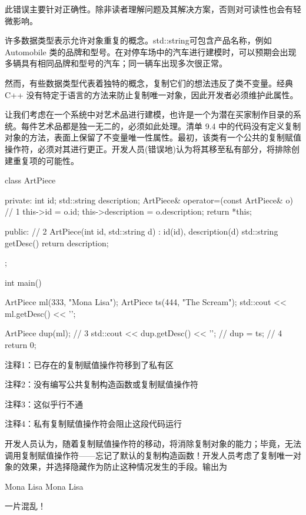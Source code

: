 此错误主要针对正确性。除非读者理解问题及其解决方案，否则对可读性也会有轻微影响。

许多数据类型表示允许对象重复的概念。std::string可包含产品名称，例如 Automobile 类的品牌和型号。在对停车场中的汽车进行建模时，可以预期会出现多辆具有相同品牌和型号的汽车；同一辆车出现多次很正常。

然而，有些数据类型代表着独特的概念，复制它们的想法违反了类不变量。经典 C++ 没有特定于语言的方法来防止复制唯一对象，因此开发者必须维护此属性。


让我们考虑在一个系统中对艺术品进行建模，也许是一个为潜在买家制作目录的系统。每件艺术品都是独一无二的，必须如此处理。清单 9.4 中的代码没有定义复制对象的方法，表面上保留了不变量唯一性属性。最初，该类有一个公共的复制赋值操作符，必须对其进行更正。开发人员(错误地)认为将其移至私有部分，将排除创建重复项的可能性。


\begin{cpp}
class ArtPiece {
private:
  int id;
  std::string description;
  ArtPiece& operator=(const ArtPiece& o) { // 1
    this->id = o.id;
    this->description = o.description;
    return *this;
  }

public: // 2
  ArtPiece(int id, std::string d) : id(id), description(d) {}
  std::string getDesc() { return description; }
};

int main() {
  ArtPiece ml(333, "Mona Lisa");
  ArtPiece ts(444, "The Scream");
  std::cout << ml.getDesc() << '\n';

  ArtPiece dup(ml); // 3
  std::cout << dup.getDesc() << '\n';
  // dup = ts; // 4
  return 0;
}
\end{cpp}

{\footnotesize
注释1：已存在的复制赋值操作符移到了私有区

注释2：没有编写公共复制构造函数或复制赋值操作符

注释3：这似乎行不通

注释4：私有复制赋值操作符会阻止这段代码运行
}

开发人员认为，随着复制赋值操作符的移动，将消除复制对象的能力；毕竟，无法调用复制赋值操作符——忘记了默认的复制构造函数！开发人员考虑了复制唯一对象的效果，并选择隐藏作为防止这种情况发生的手段。输出为

\begin{shell}
Mona Lisa
Mona Lisa
\end{shell}

一片混乱！

